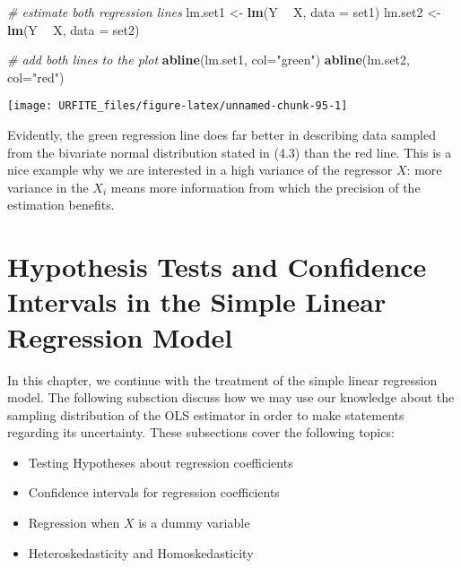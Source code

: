 \documentclass[]{book}
\newenvironment{Shaded}{\begin{snugshade}}{\end{snugshade}}
\newcommand{\KeywordTok}[1]{\textcolor[rgb]{0.13,0.29,0.53}{\textbf{#1}}}
\newcommand{\DataTypeTok}[1]{\textcolor[rgb]{0.13,0.29,0.53}{#1}}
\newcommand{\StringTok}[1]{\textcolor[rgb]{0.31,0.60,0.02}{#1}}
\newcommand{\CommentTok}[1]{\textcolor[rgb]{0.56,0.35,0.01}{\textit{#1}}}
\newcommand{\OperatorTok}[1]{\textcolor[rgb]{0.81,0.36,0.00}{\textbf{#1}}}
\newcommand{\NormalTok}[1]{#1}
\theoremstyle{definition}
\theoremstyle{definition}
\theoremstyle{definition}
\theoremstyle{remark}
\begin{document}
\begin{Shaded}
\begin{Highlighting}[]
\CommentTok{# estimate both regression lines}
\NormalTok{lm.set1 <-}\StringTok{ }\KeywordTok{lm}\NormalTok{(Y }\OperatorTok{~}\StringTok{ }\NormalTok{X, }\DataTypeTok{data =}\NormalTok{ set1)}
\NormalTok{lm.set2 <-}\StringTok{ }\KeywordTok{lm}\NormalTok{(Y }\OperatorTok{~}\StringTok{ }\NormalTok{X, }\DataTypeTok{data =}\NormalTok{ set2)}

\CommentTok{# add both lines to the plot}
\KeywordTok{abline}\NormalTok{(lm.set1, }\DataTypeTok{col=}\StringTok{"green"}\NormalTok{)}
\KeywordTok{abline}\NormalTok{(lm.set2, }\DataTypeTok{col=}\StringTok{"red"}\NormalTok{)}
\end{Highlighting}
\end{Shaded}

\begin{center}\texttt{[image: URFITE\_files/figure-latex/unnamed-chunk-95-1]} \end{center}

Evidently, the green regression line does far better in describing data
sampled from the bivariate normal distribution stated in (4.3) than the
red line. This is a nice example why we are interested in a high
variance of the regressor \(X\): more variance in the \(X_i\) means more
information from which the precision of the estimation benefits.

\chapter{Hypothesis Tests and Confidence Intervals in the Simple Linear
Regression
Model}\label{hypothesis-tests-and-confidence-intervals-in-the-simple-linear-regression-model}

In this chapter, we continue with the treatment of the simple linear
regression model. The following subsction discuss how we may use our
knowledge about the sampling distribution of the OLS estimator in order
to make statements regarding its uncertainty. These subsections cover
the following topics:

\begin{itemize}
\item
  Testing Hypotheses about regression coefficients
\item
  Confidence intervals for regression coefficients
\item
  Regression when \(X\) is a dummy variable
\item
  Heteroskedasticity and Homoskedasticity
\end{itemize}
\end{document}
